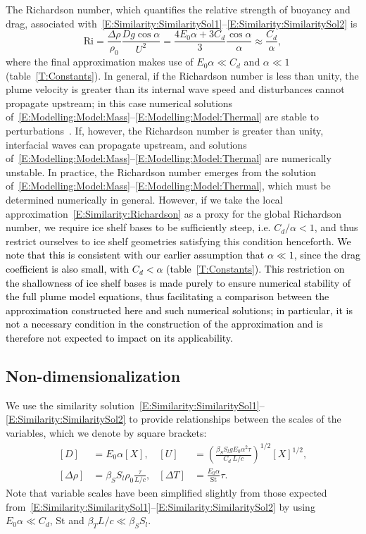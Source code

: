 \documentclass[openacc]{rsproca_new}%
\newcommand{\blue}[1]{{\color{blue} #1}}
\renewcommand{\blue}[1]{{\textcolor{black}{#1}}} %
\begin{document}
The Richardson number, which quantifies the relative strength of buoyancy and drag, associated with~\eqref{E:Similarity:SimilaritySol1}--\eqref{E:Similarity:SimilaritySol2} is
\begin{equation}\label{E:Similarity:Richardson}
\mathrm{Ri} = \frac{\Delta \rho}{\rho_0}\frac{D g \cos \alpha}{U^2} = \frac{4E_0 \alpha + 3C_d}{3} \frac{\cos \alpha}{\alpha} \approx \frac{C_d}{\alpha},
\end{equation}
where the final approximation makes use of $E_0 \alpha \ll C_d$ and $\alpha \ll 1$ (table~\ref{T:Constants}). In general, if the Richardson number is less than unity, the plume velocity is greater than its internal wave speed and disturbances cannot propagate upstream; in this case numerical solutions of~\eqref{E:Modelling:Model:Mass}--\eqref{E:Modelling:Model:Thermal} are stable to perturbations~\cite{Jenkinsphdthesis}. If, however, the Richardson number is greater than unity, interfacial waves can propagate upstream, and solutions of~\eqref{E:Modelling:Model:Mass}--\eqref{E:Modelling:Model:Thermal} are numerically unstable. In practice, the Richardson number emerges from the solution of~\eqref{E:Modelling:Model:Mass}--\eqref{E:Modelling:Model:Thermal}, which must be determined numerically in general. However, if we take the local approximation~\eqref{E:Similarity:Richardson} as a proxy for the global Richardson number, we require ice shelf bases to be sufficiently steep, i.e. $C_d/\alpha < 1$, and thus restrict ourselves to ice shelf geometries satisfying this condition henceforth. \blue{We note that this is consistent with our earlier assumption that $\alpha \ll 1$, since the drag coefficient is also small, with $C_d < \alpha$ (table~\ref{T:Constants}). This restriction on the shallowness of ice shelf bases is made purely to ensure numerical stability of the full plume model equations, thus facilitating a comparison between the approximation constructed here and such numerical solutions; in particular, it is not a necessary condition in the construction of the approximation and is therefore not expected to impact on its applicability.}

\subsection{Non-dimensionalization}\label{S:Model:NonDim}
We use the similarity solution~\eqref{E:Similarity:SimilaritySol1}--\eqref{E:Similarity:SimilaritySol2} to provide relationships between the scales of the variables, which we denote by square brackets:
\begin{align}
\left[D\right] &= E_0 \alpha \left[X\right], & \left[U\right] &= \left(\frac{\beta_S S_l g E_0 \alpha^2 \tau}{C_d ~L/c}\right)^{1/2}[X]^{1/2},\label{E:Similarity:Scales1}\\
\left[\Delta \rho\right] &= \beta_S S_l \rho_0 \frac{\tau}{L/c}, & \left[\Delta T\right] &= \frac{E_0 \alpha}{\mathrm{St}}\tau.\label{E:Similarity:Scales2}
\end{align}
Note that variable scales have been simplified slightly from those expected from~\eqref{E:Similarity:SimilaritySol1}--\eqref{E:Similarity:SimilaritySol2} by using $E_0 \alpha \ll C_d$, $\mathrm{St}$ and $\beta_T L /c \ll \beta_S S_l$.
\end{document}
